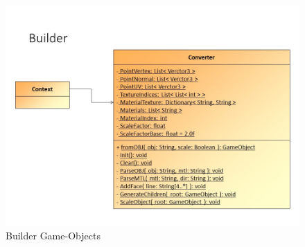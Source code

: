 \begin{figure}[!ht]
	\centering
	\includegraphics[scale=0.5]{Diagrams/Slide9.jpg}
	\caption{Builder Game-Objects}
\end{figure}